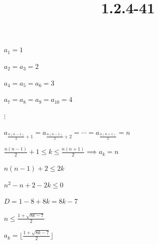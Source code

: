 \documentclass{article}
\title{1.2.4-41}
\begin{document}
\maketitle

\( a_1 = 1 \)

\( a_2 = a_3 = 2 \)

\( a_4 = a_5 = a_6 = 3 \)

\( a_7 = a_8 = a_9 = a_{10} = 4 \)

\( \vdots \)

\( a_{\frac{n(n-1)}{2} + 1} = a_{\frac{n(n-1)}{2} + 2} = \cdots = a_{\frac{n(n+1)}{2}} = n \)

\( \frac{n(n-1)}{2} + 1 \leq k \leq \frac{n(n+1)}{2} \implies a_k = n \)

\( n(n-1)  +2 \leq 2k \)

\( n^2-n + 2-2k \leq 0 \)

\( D = 1 - 8 + 8k = 8k - 7 \)

\( n \leq \frac{1 + \sqrt{8k-7}}{2} \)

\( a_k = \lfloor \frac{1 + \sqrt{8k-7}}{2} \rfloor \)
\end{document}
